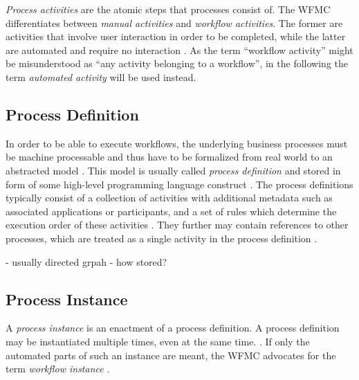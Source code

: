     \emph{Process activities} are the atomic steps that processes consist of. The \ac{WFMC} differentiates between \emph{manual activities} and \emph{workflow activities}. The former are activities that involve user interaction in order to be completed, while the latter are automated and require no interaction \cite{Hollingsworth1995Wfmc}. As the term ``workflow activity'' might be misunderstood as ``any activity belonging to a workflow'', in the following the term \emph{automated activity} will be used instead.


  \subsection{Process Definition} %
  \label{sub:process_definition}
      In order to be able to execute workflows, the underlying business processes must be machine processable and thus have to be formalized from real world to an abstracted model \cite{Hollingsworth1995Wfmc}. This model is usually called \emph{process definition} and stored in form of some high-level programming language construct \cite{Hollingsworth1995Wfmc,Wutke2008Model}. 
      The process definitions typically consist of a collection of activities with additional metadata such as associated applications or participants, and a set of rules which determine the execution order of these activities \cite{Hollingsworth1995Wfmc}. They further may contain references to other processes, which are treated as a single activity in the process definition \cite{Hollingsworth1995Wfmc,Casati1999Specification}.

      - usually directed grpah 
      - how stored?

  \subsection{Process Instance} %
  \label{sub:process_instance}
    A \emph{process instance} is an enactment of a process definition. A process definition may be instantiated multiple times, even at the same time. \cite{Casati1999Specification}. If only the automated parts of such an instance are meant, the \ac{WFMC} advocates for the term \emph{workflow instance} \cite{Hollingsworth1995Wfmc}. 

